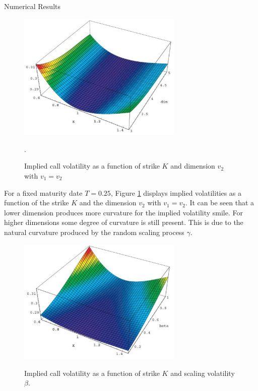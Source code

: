 \documentclass[unknownkeysallowed, compress]{beamer}
\theoremstyle{plain}
\begin{document}
\begin{frame}[allowframebreaks]{Numerical Results}
\begin{figure}[hp]
	\centering
		\includegraphics[width=0.70\textwidth]{fig3.JPG}
	\label{image3}
	\caption{Implied call volatility as a function of strike $K$ and dimension $v_2$ with $v_1 = v_2$}.
\end{figure}
\par For a fixed maturity date $T = 0.25$, Figure \ref{image3} displays implied volatilities as a
function of the strike $K$ and the dimension $v_2$ with $v_1 = v_2$. It can be seen that a
lower dimension produces more curvature for the implied volatility smile. For
higher dimensions some degree of curvature is still present. This is due to the
natural curvature produced by the random scaling process $\gamma$. 


\newpage
\begin{figure}[hp]
	\centering
		\includegraphics[width=0.70\textwidth]{fig4.JPG}
	\label{image4}
	\caption{Implied call volatility as a function of strike $K$ and scaling volatility $\beta$.}
\end{figure}


\end{frame}
\end{document}
